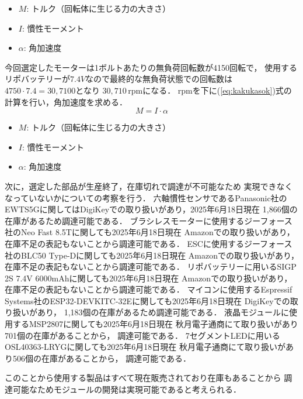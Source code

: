 \documentclass[uplatex,dvipdfmx]{jsarticle}
\begin{document}
\begin{itemize}
    \item \( M \): トルク（回転体に生じる力の大きさ）
    \item \( I \): 慣性モーメント
    \item \( \alpha \): 角加速度
\end{itemize}

今回選定したモーターは1ボルトあたりの無負荷回転数が4150回転で，
使用するリポバッテリーが$7.4V$なので最終的な無負荷状態での回転数は$4750\cdot 7.4 = 30,7100$となり
$30,710 \, \mathrm{rpm}$になる．
$\mathrm{rpm}$を下に(\ref{eq:kakukasok})式の計算を行い，角加速度を求める\cite{kakukaso}．
\begin{equation}
M = I \cdot \alpha
\label{eq:kakukasok}
\end{equation}

\begin{itemize}
    \item \( M \): トルク（回転体に生じる力の大きさ）
    \item \( I \): 慣性モーメント
    \item \( \alpha \): 角加速度
\end{itemize}

次に，選定した部品が生産終了，在庫切れで調達が不可能なため
実現できなくなっていないかについての考察を行う．
六軸慣性センサであるPanasonic社のEWTS5Gに関してはDigiKeyでの取り扱いがあり，2025年6月18日現在
1,866個の在庫があるため調達可能である\cite{rokujiku}．
ブラシレスモーターに使用するジーフォース社のNeo Fast 8.5Tに関しても2025年6月18日現在
Amazonでの取り扱いがあり，在庫不足の表記もないことから調達可能である\cite{burasiresu}．
ESCに使用するジーフォース社のBLC50 Type-Dに関しても2025年6月18日現在
Amazonでの取り扱いがあり，在庫不足の表記もないことから調達可能である\cite{esc}．
リポバッテリーに用いるSIGP 2S 7.4V 6000mAhに関しても2025年6月18日現在
Amazonでの取り扱いがあり，在庫不足の表記もないことから調達可能である\cite{lipo}．
マイコンに使用するEspressif Systems社のESP32-DEVKITC-32Eに関しても2025年6月18日現在
DigiKeyでの取り扱いがあり，
1,183個の在庫があるため調達可能である\cite{maikon}．
液晶モジュールに使用するMSP2807に関しても2025年6月18日現在
秋月電子通商にて取り扱いがあり701個の在庫があることから，
調達可能である\cite{ekisyou}．
7セグメントLEDに用いるOSL40363-LRYGに関しても2025年6月18日現在
秋月電子通商にて取り扱いがあり506個の在庫があることから，
調達可能である\cite{seg7}．

このことから使用する製品はすべて現在販売されており在庫もあることから
調達可能なためモジュールの開発は実現可能であると考えられる．
\end{document}
